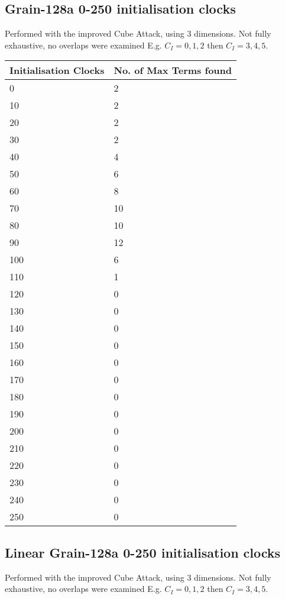 \documentclass{report}
\let\Oldsubsection\subsection
\renewcommand{\subsection}{\FloatBarrier\Oldsubsection}
\begin{document}
\begin{appendices}
\subsection{Grain-128a 0-250 initialisation clocks}
Performed with the improved Cube Attack, using 3 dimensions.
Not fully exhaustive, no overlaps were examined
E.g. $C_I={0,1,2}$ then $C_I={3,4,5}$.
\begin{center}
    \begin{tabular}{| l | l |}
    \hline
    Initialisation Clocks & No. of Max Terms found\\ \hline
    0 & 2\\ \hline
    10 & 2\\ \hline
    20 & 2\\ \hline
    30 & 2\\ \hline
    40 & 4\\ \hline
    50 & 6\\ \hline
    60 & 8\\ \hline
    70 & 10\\ \hline
    80 & 10\\ \hline
    90 & 12\\ \hline
    100 & 6\\ \hline
    110 & 1\\ \hline
    120 & 0\\ \hline
    130 & 0\\ \hline
    140 & 0\\ \hline
    150 & 0\\ \hline
    160 & 0\\ \hline
    170 & 0\\ \hline
    180 & 0\\ \hline
    190 & 0\\ \hline
    200 & 0\\ \hline
    210 & 0\\ \hline
    220 & 0\\ \hline
    230 & 0\\ \hline
    240 & 0\\ \hline
    250 & 0\\ \hline
    \end{tabular}
\end{center}
\newpage
\subsection{Linear Grain-128a 0-250 initialisation clocks}
Performed with the improved Cube Attack, using 3 dimensions.
Not fully exhaustive, no overlaps were examined
E.g. $C_I={0,1,2}$ then $C_I={3,4,5}$.


\end{appendices}
\end{document}
